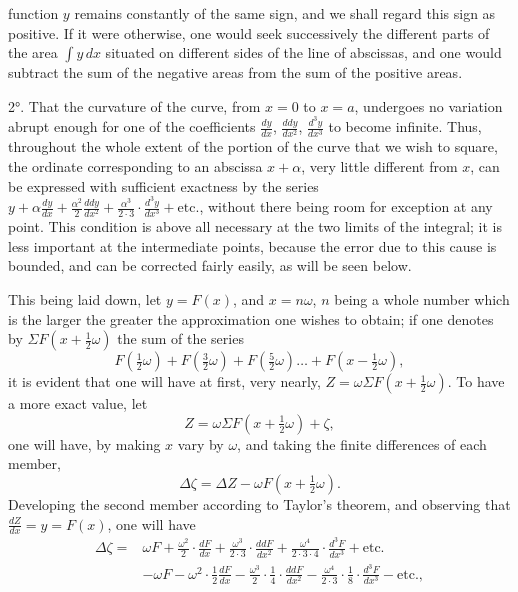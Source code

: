 \documentclass{article}
\begin{document}
function $y$ remains constantly of the same sign, and we shall regard this sign as positive. If it were otherwise, one would seek successively the different parts of the area $\displaystyle\int y\,dx$ situated on different sides of the line of abscissas, and one would subtract the sum of the negative areas from the sum of the positive areas.

2°. That the curvature of the curve, from $x=0$ to $x=a$, undergoes no variation abrupt enough for one of the coefficients $\frac{dy}{dx}$, $\frac{ddy}{dx^{2}}$, $\frac{d^{3}y}{dx^{3}}$ to become infinite. Thus, throughout the whole extent of the portion of the curve that we wish to square, the ordinate corresponding to an abscissa $x+\alpha$, very little different from $x$, can be expressed with sufficient exactness by the series $y+\alpha\frac{dy}{dx}+\frac{\alpha^{2}}{2}\frac{ddy}{dx^{2}}+\frac{\alpha^{3}}{2\cdot3}\cdot\frac{d^{3}y}{dx^{3}}+\text{etc.}$, without there being room for exception at any point. This condition is above all necessary at the two limits of the integral; it is less important at the intermediate points, because the error due to this cause is bounded, and can be corrected fairly easily, as will be seen below.

This being laid down, let $y=F(x)$, and $x=n\omega$, $n$ being a whole number which is the larger the greater the approximation one wishes to obtain; if one denotes by $\Sigma F(x+\frac{1}{2}\omega)$ the sum of the series
\[ F(\tfrac{1}{2}\omega)+F(\tfrac{3}{2}\omega)+F(\tfrac{5}{2}\omega)\ldots+F(x-\tfrac{1}{2}\omega), \]
it is evident that one will have at first, very nearly, $Z=\omega\Sigma F(x+\frac{1}{2}\omega)$. To have a more exact value, let
\[ Z=\omega\Sigma F(x+\tfrac{1}{2}\omega)+\zeta, \]
one will have, by making $x$ vary by $\omega$, and taking the finite differences of each member,
\[ \Delta\zeta=\Delta Z-\omega F(x+\tfrac{1}{2}\omega). \]
Developing the second member according to Taylor's theorem, and observing that $\frac{dZ}{dx}=y=F(x)$, one will have
\[ \begin{aligned} \Delta\zeta={}&\omega F+\frac{\omega^{2}}{2}\cdot\frac{dF}{dx}+\frac{\omega^{3}}{2\cdot3}\cdot\frac{ddF}{dx^{2}}+\frac{\omega^{4}}{2\cdot3\cdot4}\cdot\frac{d^{3}F}{dx^{3}}+\text{etc.}\\ &-\omega F-\omega^{2}\cdot\frac{1}{2}\frac{dF}{dx}-\frac{\omega^{3}}{2}\cdot\frac{1}{4}\cdot\frac{ddF}{dx^{2}}-\frac{\omega^{4}}{2\cdot3}\cdot\frac{1}{8}\cdot\frac{d^{3}F}{dx^{3}}-\text{etc.}, \end{aligned} \]
\end{document}
